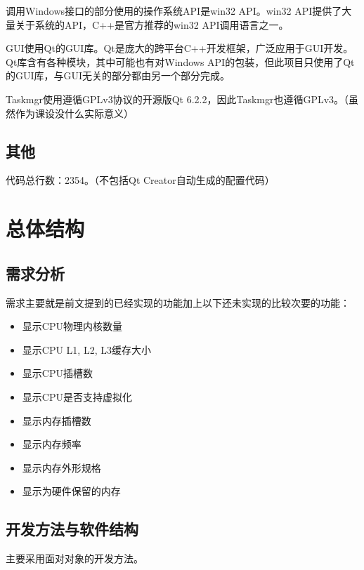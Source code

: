 \documentclass[UTF8,twoside,titlepage]{ctexart}
\begin{document}
调用Windows接口的部分使用的操作系统API是win32 API。win32 API提供了大量关于系统的API，C++是官方推荐的win32 API调用语言之一。

GUI使用Qt的GUI库。Qt是庞大的跨平台C++开发框架，广泛应用于GUI开发。Qt库含有各种模块，其中可能也有对Windows API的包装，但此项目只使用了Qt的GUI库，与GUI无关的部分都由另一个部分完成。

Taskmgr使用遵循GPLv3协议的开源版Qt 6.2.2，因此Taskmgr也遵循GPLv3。（虽然作为课设没什么实际意义）

\subsection{其他}
代码总行数：2354。（不包括Qt Creator自动生成的配置代码）

\section{总体结构}

\subsection{需求分析}
\label{sec:request}
需求主要就是前文提到的已经实现的功能加上以下还未实现的比较次要的功能：

\begin{itemize}
    \item 显示CPU物理内核数量
    \item 显示CPU L1, L2, L3缓存大小
    \item 显示CPU插槽数
    \item 显示CPU是否支持虚拟化
    \item 显示内存插槽数
    \item 显示内存频率
    \item 显示内存外形规格
    \item 显示为硬件保留的内存
\end{itemize}

\subsection{开发方法与软件结构}
主要采用面对对象的开发方法。
\end{document}
